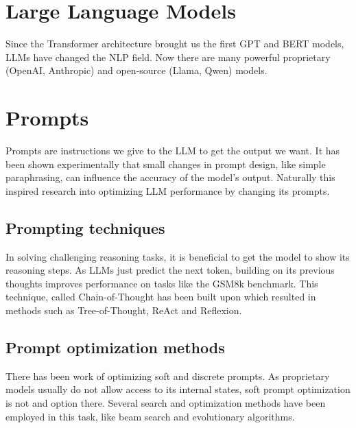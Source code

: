 \section{Large Language Models}
Since the Transformer architecture  brought us the first GPT and BERT models, LLMs have changed the NLP field.
Now there are many powerful proprietary (OpenAI, Anthropic) and open-source (Llama, Qwen) models. 

\section{Prompts}
Prompts are instructions we give to the LLM to get the output we want.  
It has been shown experimentally that small changes in prompt design, like simple paraphrasing, can influence the accuracy of the model's output.  
Naturally this inspired research into optimizing LLM performance by changing its prompts.
\subsection{Prompting techniques}
In solving challenging reasoning tasks, it is beneficial to get the model to show its reasoning steps. 
As LLMs just predict the next token, building on its previous thoughts improves performance on tasks like the GSM8k benchmark.
This technique, called Chain-of-Thought has been built upon which resulted in methods such as Tree-of-Thought, ReAct and Reflexion.  
\subsection{Prompt optimization methods}
There has been work of optimizing soft and discrete prompts. 
As proprietary models usually do not allow access to its internal states, soft prompt optimization is not and option there.
Several search and optimization methods have been employed in this task, like beam search and evolutionary algorithms. 